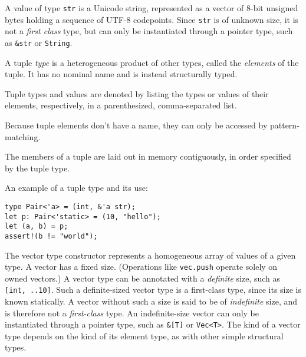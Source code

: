 \documentclass[]{article}
\begin{document}
A value of type \texttt{str} is a Unicode string, represented as a
vector of 8-bit unsigned bytes holding a sequence of UTF-8 codepoints.
Since \texttt{str} is of unknown size, it is not a \emph{first class}
type, but can only be instantiated through a pointer type, such as
\texttt{\&str} or \texttt{String}.


A tuple \emph{type} is a heterogeneous product of other types, called
the \emph{elements} of the tuple. It has no nominal name and is instead
structurally typed.

Tuple types and values are denoted by listing the types or values of
their elements, respectively, in a parenthesized, comma-separated list.

Because tuple elements don't have a name, they can only be accessed by
pattern-matching.

The members of a tuple are laid out in memory contiguously, in order
specified by the tuple type.

An example of a tuple type and its use:

\begin{verbatim}
type Pair<'a> = (int, &'a str);
let p: Pair<'static> = (10, "hello");
let (a, b) = p;
assert!(b != "world");
\end{verbatim}


The vector type constructor represents a homogeneous array of values of
a given type. A vector has a fixed size. (Operations like
\texttt{vec.push} operate solely on owned vectors.) A vector type can be
annotated with a \emph{definite} size, such as \texttt{{[}int, ..10{]}}.
Such a definite-sized vector type is a first-class type, since its size
is known statically. A vector without such a size is said to be of
\emph{indefinite} size, and is therefore not a \emph{first-class} type.
An indefinite-size vector can only be instantiated through a pointer
type, such as \texttt{\&{[}T{]}} or
\texttt{Vec\textless{}T\textgreater{}}. The kind of a vector type
depends on the kind of its element type, as with other simple structural
types.
\end{document}
